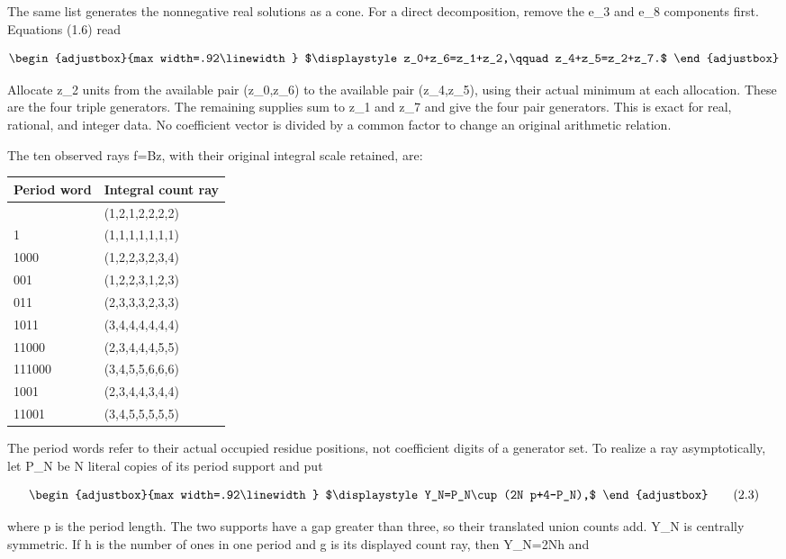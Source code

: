 The same list generates the nonnegative real solutions as a cone. For a direct decomposition, remove the e\_3 and e\_8 components first. Equations (1.6) read

\[
\begin{adjustbox}{max width=.92\linewidth}
$\displaystyle z_0+z_6=z_1+z_2,\qquad z_4+z_5=z_2+z_7.$
\end{adjustbox}
\]

Allocate z\_2 units from the available pair (z\_0,z\_6) to the available pair (z\_4,z\_5), using their actual minimum at each allocation. These are the four triple generators. The remaining supplies sum to z\_1 and z\_7 and give the four pair generators. This is exact for real, rational, and integer data. No coefficient vector is divided by a common factor to change an original arithmetic relation.

The ten observed rays f=Bz, with their original integral scale retained, are:

\begin{longtable}[]{@{}ll@{}}
\toprule\noalign{}
Period word & Integral count ray \\
\midrule\noalign{}
\endhead
\bottomrule\noalign{}
\endlastfoot
10 & (1,2,1,2,2,2,2) \\
1 & (1,1,1,1,1,1,1) \\
1000 & (1,2,2,3,2,3,4) \\
001 & (1,2,2,3,1,2,3) \\
011 & (2,3,3,3,2,3,3) \\
1011 & (3,4,4,4,4,4,4) \\
11000 & (2,3,4,4,4,5,5) \\
111000 & (3,4,5,5,6,6,6) \\
1001 & (2,3,4,4,3,4,4) \\
11001 & (3,4,5,5,5,5,5) \\
\end{longtable}

The period words refer to their actual occupied residue positions, not coefficient digits of a generator set. To realize a ray asymptotically, let P\_N be N literal copies of its period support and put

\[
\begin{adjustbox}{max width=.92\linewidth}
$\displaystyle Y_N=P_N\cup(2N p+4-P_N),$
\end{adjustbox}
\tag{2.3}
\]

where p is the period length. The two supports have a gap greater than three, so their translated union counts add. Y\_N is centrally symmetric. If h is the number of ones in one period and g is its displayed count ray, then \textbar Y\_N\textbar=2Nh and

